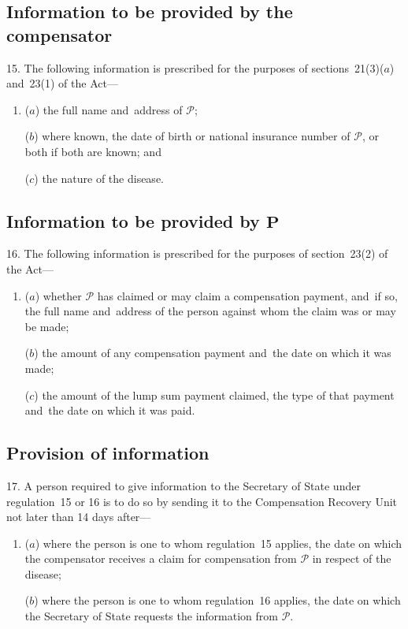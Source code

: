 \documentclass[12pt,a4paper]{article}
\begin{document}
\renewcommand\parthead{--- Part V}

\subsection[15. Information to be provided by the compensator]{Information to be provided by the compensator}

15.  The following information is prescribed for the purposes of sections~21(3)($a$)  and~23(1) of the Act—
\begin{enumerate}\item[]
($a$) the full name and~address of $\mathcal{P}$;

($b$) where known, the date of birth or national insurance number of $\mathcal{P}$, or both if both are known; and

($c$) the nature of the disease.
\end{enumerate}

\subsection[16. Information to be provided by $\mathcal{P}$]{Information to be provided by $\mathbf{P}$}

16.  The following information is prescribed for the purposes of section~23(2) of the Act—
\begin{enumerate}\item[]
($a$) whether $\mathcal{P}$ has claimed or may claim a compensation payment, and~if so, the full name and~address of the person against whom the claim was or may be made;

($b$) the amount of any compensation payment and~the date on which it was made;

($c$) the amount of the lump sum payment claimed, the type of that payment and~the date on which it was paid.
\end{enumerate}

\subsection[17. Provision of information]{Provision of information}

17.  A person required to give information to the Secretary of State under regulation~15 or 16 is to do so by sending it to the Compensation Recovery Unit not later than 14 days after—
\begin{enumerate}\item[]
($a$) where the person is one to whom regulation~15 applies, the date on which the compensator receives a claim for compensation from $\mathcal{P}$ in respect of the disease;

($b$) where the person is one to whom regulation~16 applies, the date on which the Secretary of State requests the information from $\mathcal{P}$.
\end{enumerate}
\end{document}
